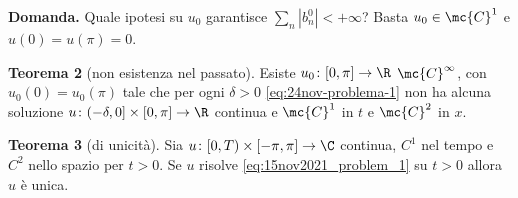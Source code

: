 \textbf{Domanda.} Quale ipotesi su $u_0$ garantisce $\sum_n |b_n^0| < +\infty$? Basta $u_0 \in \mc{C}^1$ e $u(0) = u(\pi) = 0$.

\textbf{Teorema 2} (non esistenza nel passato).
Esiste $u_0 \colon [0,\pi] \to \R$ $\mc{C}^\infty$, con $u_0(0) = u_0(\pi)$ tale che per ogni $\delta > 0$ \eqref{eq:24nov-problema-1} non ha alcuna soluzione $u \colon (-\delta,0] \times [0,\pi] \to \R$ continua e $\mc{C}^1$ in $t$ e $\mc{C}^2 $ in $x$.

\textbf{Teorema 3} (di unicità).
Sia $u \colon [0, T) \times [-\pi, \pi] \to \C$ continua, $C^1$ nel tempo e $C^2$ nello spazio per $t > 0$. Se $u$ risolve \eqref{eq:15nov2021_problem_1} su $t > 0$ allora $u$ è unica.
